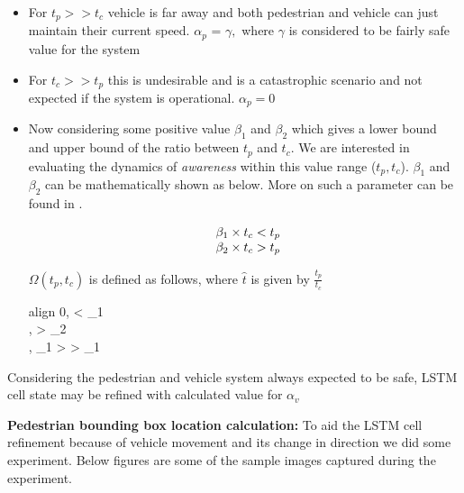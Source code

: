 \begin{itemize}
\item 
For ${t_p}>>{t_c}$ vehicle is far away and both pedestrian and vehicle can just maintain their current speed. $\alpha_p$ = $\gamma,$ where $\gamma$ is considered to be fairly safe value for the system

\item 
For ${t_c}>>{t_p}$ this is undesirable and is a catastrophic scenario and not expected if the system is operational. $\alpha_p = 0$

\item
	Now considering some positive value $\beta_1$ and $\beta_2$ which gives a lower bound and upper bound of the ratio between $t_p$ and $t_c$. We are interested in evaluating the dynamics of \textit{awareness} within this value range ($t_p, t_c$). $\beta_1$ and $\beta_2$ can be mathematically shown as below. More on such a parameter can be found in \cite{yousef2016forward}.

	\begin{equation}
	\begin{array}{l@{}}
		\beta_1 \times {t_c} < {t_p} \\
		\beta_2 \times {t_c} > {t_p}
	\end{array}
	\end{equation}

	$\Omega(t_p, t_c)$ is defined as follows, where $\hat{t}$ is given by $\frac{t_p}{t_c}$\\
	\begin{empheq}[left=\empheqlbrace]{align}
		0,  < \beta_1 \\
		\gamma,  > \beta_2 \\
		\gamma \times {}, \beta_1 >  > \beta_1
	\end{empheq}

\end {itemize}

Considering the pedestrian and vehicle system always expected to be safe, LSTM cell state may be refined with calculated value for $\alpha_v$

\newpara
\textbf{Pedestrian bounding box location calculation:}
To aid the LSTM cell refinement because of vehicle movement and its change in direction we did some experiment. Below figures are some of the sample images captured during the experiment. %


